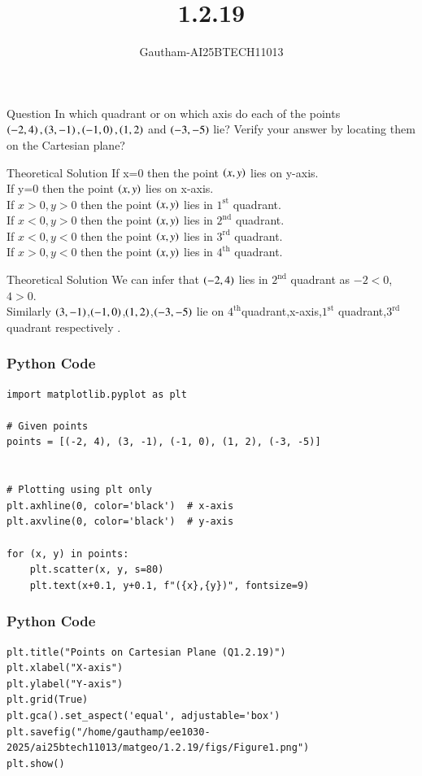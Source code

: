 \documentclass{beamer}
\title %
{1.2.19}
\author %
{Gautham-AI25BTECH11013}
\begin{document}
\frame{\titlepage}
\begin{frame}{Question}
In which quadrant or on which axis do each of the points $\left(-2,4\right),\left(3,-1\right),\left(-1,0\right),\left(1,2\right)$ and $\left(-3,-5\right)$ lie?       Verify your answer by locating them on the Cartesian plane?
\end{frame}
\begin{frame}{Theoretical Solution}
If x=0 then the point $\left(x,y\right)$ lies on y-axis.\\
If y=0 then the point $\left(x,y\right)$ lies on x-axis.\\
If $x>0,y>0$ then the point $\left(x,y\right)$ lies in $1^\text{st}$ quadrant.\\
If $x<0,y>0$ then the point $\left(x,y\right)$ lies in $2^\text{nd}$ quadrant. \\
If $x<0,y<0$ then the point $\left(x,y\right)$ lies in $3^\text{rd}$ quadrant. \\
If $x>0,y<0$ then the point $\left(x,y\right)$ lies in $4^\text{th}$ quadrant. \\
\end{frame}
\begin{frame}{Theoretical Solution}
    We can infer that $\left(-2,4\right)$ lies in $2^\text{nd}$ quadrant as $-2<0$,$4>0$. \\
Similarly $\left(3,-1\right)$,$\left(-1,0\right)$,$\left(1,2\right)$,$\left(-3,-5\right)$ lie on $4^\text{th}$quadrant,x-axis,$1^\text{st}$ quadrant,$3^\text{rd}$ quadrant respectively . 
\end{frame}
\begin{frame}[fragile]
\frametitle{Python Code}
   \begin{lstlisting}
import matplotlib.pyplot as plt

# Given points
points = [(-2, 4), (3, -1), (-1, 0), (1, 2), (-3, -5)]


# Plotting using plt only
plt.axhline(0, color='black')  # x-axis
plt.axvline(0, color='black')  # y-axis

for (x, y) in points:
    plt.scatter(x, y, s=80)
    plt.text(x+0.1, y+0.1, f"({x},{y})", fontsize=9)
\end{lstlisting}
\end{frame}
\begin{frame}[fragile]
\frametitle{Python Code}
   \begin{lstlisting}
plt.title("Points on Cartesian Plane (Q1.2.19)")
plt.xlabel("X-axis")
plt.ylabel("Y-axis")
plt.grid(True)
plt.gca().set_aspect('equal', adjustable='box')
plt.savefig("/home/gauthamp/ee1030-2025/ai25btech11013/matgeo/1.2.19/figs/Figure1.png")
plt.show()
\end{lstlisting}
\end{frame}
\end{document}
